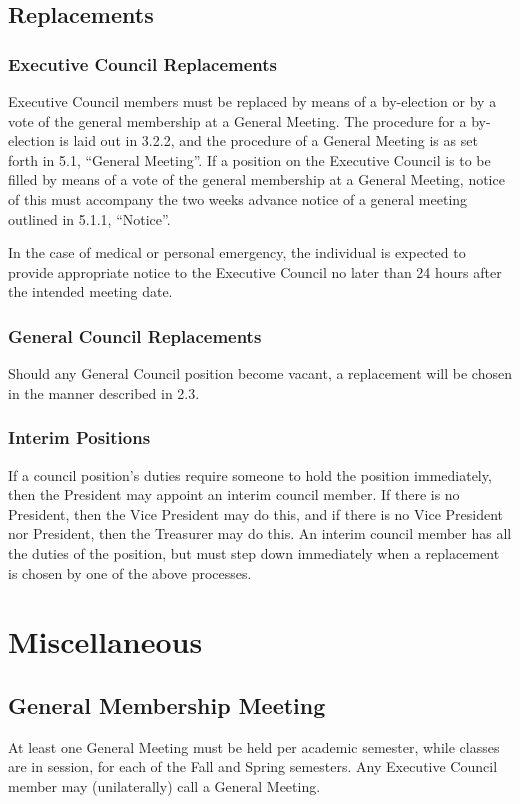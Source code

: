 \documentclass{article}
\begin{document}
\subsection{Replacements} \label{sec:4.4}
\subsubsection{Executive Council Replacements}  \label{sec:4.4.1}
Executive Council members must be replaced by means of a by-election or by a vote of the general membership at a General Meeting. The procedure for a by-election is laid out in 3.2.2, and the procedure of a General Meeting is as set forth in 5.1, “General Meeting”. If a position on the Executive Council is to be filled by means of a vote of the general membership at a General Meeting, notice of this must accompany the two weeks advance notice of a general meeting outlined in 5.1.1, “Notice”.

In the case of medical or personal emergency, the individual is expected to provide
appropriate notice to the Executive Council no later than 24 hours after the intended meeting date.

\subsubsection{General Council Replacements}  \label{sec:4.4.2}
Should any General Council position become vacant, a replacement will be chosen in the manner described in 2.3.
\subsubsection{Interim Positions}  \label{sec:4.4.3}
If a council position's duties require someone to hold the position immediately, then the President may appoint an interim council member. If there is no President, then the Vice President may do this, and if there is no Vice President nor President, then the Treasurer may do this.
An interim council member has all the duties of the position, but must step down immediately when a replacement is chosen by one of the above processes.

\section{Miscellaneous} \label{sec:5}

\subsection{General Membership Meeting}  \label{sec:5.1}
At least one General Meeting must be held per academic semester, while classes are in session, for each of the Fall and Spring semesters. Any Executive Council member may (unilaterally) call a General Meeting.
\end{document}
